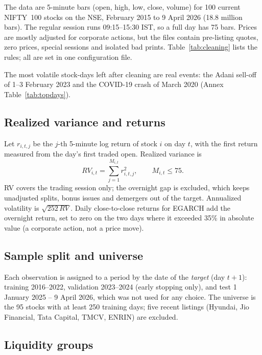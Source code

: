 The data are 5-minute bars (open, high, low, close, volume) for 100 current NIFTY~100 stocks on the
NSE, February 2015 to 9 April 2026 (18.8 million bars). The regular session runs 09:15--15:30 IST, so
a full day has 75 bars. Prices are mostly adjusted for corporate actions, but the files contain
pre-listing quotes, zero prices, special sessions and isolated bad prints. Table~\ref{tab:cleaning}
lists the rules; all are set in one configuration file.



The most volatile stock-days left after cleaning are real events: the Adani sell-off of 1--3 February
2023 and the COVID-19 crash of March 2020 (Annex Table~\ref{tab:topdays}).

\subsection{Realized variance and returns}

Let $r_{i,t,j}$ be the $j$-th 5-minute log return of stock $i$ on day $t$, with the first return measured
from the day's first traded open. Realized variance is
\begin{equation}
RV_{i,t}=\sum_{j=1}^{M_{i,t}} r_{i,t,j}^{2}, \qquad M_{i,t}\le 75 .
\end{equation}
RV covers the trading session only; the overnight gap is excluded, which keeps unadjusted splits,
bonus issues and demergers out of the target. Annualized volatility is $\sqrt{252\,RV}$. Daily
close-to-close returns for EGARCH add the overnight return, set to zero on the two days where it
exceeded 35\% in absolute value (a corporate action, not a price move).

\subsection{Sample split and universe}

Each observation is assigned to a period by the date of the \emph{target} (day $t+1$): training
2016--2022, validation 2023--2024 (early stopping only), and test 1 January 2025 -- 9 April 2026,
which was not used for any choice. The universe is the 95 stocks with at least 250 training days;
five recent listings (Hyundai, Jio Financial, Tata Capital, TMCV, ENRIN) are excluded.

\subsection{Liquidity groups}

